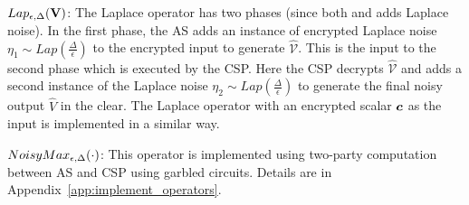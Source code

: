 $Lap_{\epsilon,\Delta}(\mathbf{V})$:  The \textsf{Laplace} operator  has two phases (since both \AS and \CSP adds Laplace noise). In the first phase,  the \textsf{AS} adds an instance of encrypted Laplace noise $\eta_1 \sim Lap(\frac{\Delta}{\epsilon})$ to the encrypted input  to generate $\mathbf{\hat{\mathcal{V}}}$. This is the input to the second phase which is executed by the \textsf{CSP}. Here the \textsf{CSP} decrypts $\mathbf{\hat{\mathcal{V}}}$ and adds a second instance of the Laplace noise $\eta_2 \sim Lap(\frac{\Delta}{\epsilon})$ to generate the final noisy output $\hat{V}$ in the clear. %
The \textsf{Laplace} operator with an encrypted scalar $\boldsymbol{c}$ as the input is implemented in a similar way.

 $NoisyMax_{\epsilon,\Delta}(\cdot)$: This operator is implemented using two-party computation between \textsf{AS} and \textsf{CSP} using garbled circuits. Details are in  Appendix~\ref{app:implement_operators}.


